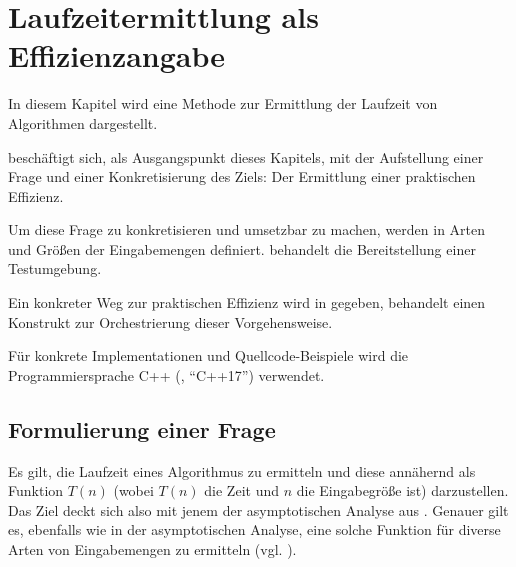 \chapter{Laufzeitermittlung als Effizienzangabe}
\label{cha:praktische-effizienz}

In diesem Kapitel wird eine Methode zur Ermittlung der Laufzeit von Algorithmen dargestellt.

 beschäftigt sich, als Ausgangspunkt dieses Kapitels, mit der Aufstellung einer Frage und einer Konkretisierung des Ziels: Der Ermittlung einer praktischen Effizienz.

Um diese Frage zu konkretisieren und umsetzbar zu machen, werden in  Arten und Größen der Eingabemengen definiert.  behandelt die Bereitstellung einer Testumgebung.

Ein konkreter Weg zur praktischen Effizienz wird in  gegeben,  behandelt einen Konstrukt zur Orchestrierung dieser Vorgehensweise.

Für konkrete Implementationen und Quellcode-Beispiele wird die Programmiersprache C++ (\cite{ISO-C++17}, \enquote{C++17}) verwendet.


\section{Formulierung einer Frage}
\label{sec:runtime-question}

Es gilt, die Laufzeit eines Algorithmus zu ermitteln und diese annähernd als Funktion $T(n)$ (wobei $T(n)$ die Zeit und $n$ die Eingabegröße ist) darzustellen. Das Ziel deckt sich also mit jenem der asymptotischen Analyse aus . Genauer gilt es, ebenfalls wie in der asymptotischen Analyse, eine solche Funktion für diverse Arten von Eingabemengen zu ermitteln (vgl. \cite[27]{mcg2012}).

